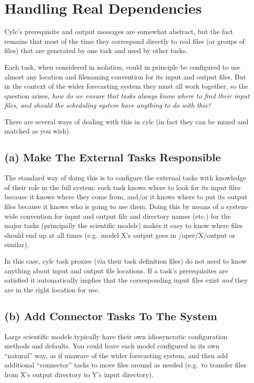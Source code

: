 \documentclass[11pt,a4paper]{article}
\begin{document}
\pagebreak
\section{Handling Real Dependencies}
\label{HandlingRealDependencies}

Cylc's prerequisite and output messages are somewhat abstract, but the
fact remains that most of the time they correspond directly to real 
files (or groups of files) that are generated by one task and used by
other tasks.

Each task, when considered in isolation, could in principle be
configured to use almost any location and filenaming convention for its
input and output files. But in the context of the wider forecasting
system they must all work together, so the question arises, {\em how do
we ensure that tasks always know where to find their input files, and
should the scheduling system have anything to do with this?} 

There are several ways of dealing with this in cylc (in fact they can
be mixed and matched as you wish). 

\subsection{(a) Make The External Tasks Responsible }

The standard way of doing this is to configure the external tasks with
knowledge of their role in the full system: each task knows where to
look for its input files because it knows where they come from, and/or
it knows where to put its output files because it knows who is going to
use them. Doing this by means of a system-wide convention for input and
output file and directory names (etc.) for the major tasks (principally
the scientific models) makes it easy to know where files should end up
at all times (e.g.\ model X's output goes in /oper/X/output or similar).

In this case, cylc task proxies (via their task definition files) do not
need to know anything about input and output file locations. If a task's
prerequisites are satisfied it automatically implies that the
corresponding input files exist {\em and} they are in the right location
for use.

\subsection{(b) Add Connector Tasks To The System} 

Large scientific models typically have their own idiosyncratic
configuration methods and defaults. You could leave each model
configured in its own ``natural'' way, as if unaware of the wider
forecasting system, and then add additional ``connector'' tasks to move
files around as needed (e.g.\ to transfer files from X's output
directory to Y's input directory).
\end{document}
